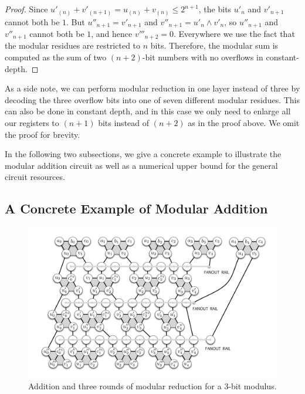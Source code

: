 \begin{proof}
Since $u'_{(n)} + v'_{(n+1)} =
u_{(n)} + v_{(n)} \le 2^{n+1}$, the bits $u'_n$ and $v'_{n+1}$ cannot both be $1$.
But $u''_{n+1} = v'_{n+1}$ and $v''_{n+1} = u'_n\land v'_n$, so $u''_{n+1}$ and
$v''_{n+1}$ cannot both be $1$, and hence $v'''_{n+2} = 0$.
Everywhere
we use the fact that the modular residues are restricted to $n$ bits.
Therefore, the modular sum is computed as the sum of two $(n+2)$-bit numbers
with no overflows in constant-depth.
\end{proof}

As a side note, we can perform modular reduction in one layer instead of
three by decoding the three overflow bits into one of seven different
modular residues. This can also be done in constant depth, and in this case
we only need to enlarge all our registers to $(n+1)$ bits instead of $(n+2)$
as in the proof above. We omit the proof for brevity.

In the following two subsections, we give a concrete example to illustrate
the modular addition circuit as well as a numerical upper bound for the
general circuit resources.

\subsection{A Concrete Example of Modular Addition}
\label{subsec:concrete}

\begin{center}
\begin{figure}[h!bt]
\centerline{
\includegraphics[width=6.5in]{figures/mod-add-fixed.pdf}
}
\caption{Addition and three rounds of modular reduction for a 3-bit
modulus.}
\label{fig:csa-add-4}
\end{figure}
\end{center}

